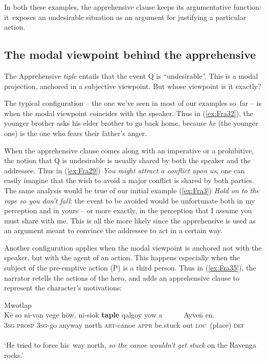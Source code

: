 \documentclass[output=paper,colorlinks,citecolor=brown]{langscibook}
\begin{document}
In both these examples, the apprehensive clause keeps its argumenta\-tive function: it~exposes an undesirable situation as an argument for justifying a particular action.




\subsection{The modal viewpoint behind the apprehensive}
\label{subsec:modalviewpoint}
 
The Apprehensive \textit{tiple} entails that the event Q is ``undesirable''. This is a modal projection, anchored in a subjective viewpoint. But whose viewpoint is it \mbox{exactly}?

The typical configuration -- the one we've seen in most of our examples so~far -- is when the modal viewpoint coincides with the speaker. Thus in (\ref{ex:Fra32}), the younger brother asks his elder brother to go back home, because \textit{he} (the younger one) is the one who fears their father's anger.

When the apprehensive clause comes along with an imperative or a prohibitive, the notion that Q is undesirable is usually shared by both the speaker and the addressee. Thus in (\ref{ex:Fra29}) \textit{You might attract a conflict upon us}, one can easily imagine that the wish to avoid a major conflict is shared by both parties. The same analysis would be true of our initial example (\ref{ex:Fra3}) \textit{Hold on to the rope so you don't fall}: the event to be avoided would be unfortunate both in my perception and in yours -- or more exactly, in the perception that I assume you must share with me. This is all the more likely since the apprehensive is used as an argument meant to convince the addressee to act in a certain way.

Another configuration applies when the modal viewpoint is anchored not with the speaker, but with the agent of an action. This happens especially when the subject of the pre-emptive action (P) is a third person. Thus in (\ref{ex:Fra35}), the narrator retells the actions of the hero, and adds an apprehensive clause to represent the character's motivations:

\ea \label{ex:Fra35} \textnormal{Mwotlap}  \\
\gll Kē so ni-van vege hōw, ni-siok \textbf{taple} qalgoy yow a~~~~~~Ayve\={n} en. \\
\textsc{3sg} \textsc{prosp} \textsc{3sg}-go anyway north \textsc{art}-canoe \textsc{appr} be.stuck out \textsc{loc}~(place) \textsc{def} \\
  \\
`He tried to force his~way north, \textit{so the canoe wouldn't get stuck} on the Ravenga rocks.' 
\z
\end{document}
